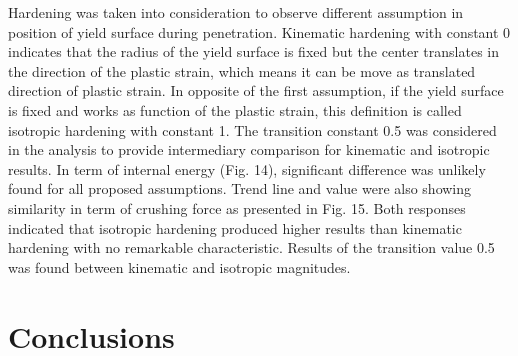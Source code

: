 \documentclass[10pt,journal]{IEEEtran}
\begin{document}
Hardening was taken into consideration to observe different assumption in position of yield surface during penetration. 
Kinematic hardening with constant 0 indicates that the radius of the yield surface is fixed but the center translates in the direction of the plastic strain, which means it can be move as translated direction of plastic strain. 
In opposite of the first assumption, if the yield surface is fixed and works as function of the plastic strain, this definition is called isotropic hardening with constant 1. 
The transition constant 0.5 was considered in the analysis to provide intermediary comparison for kinematic and isotropic results. 
In term of internal energy (Fig. 14), significant difference was unlikely found for all proposed assumptions. Trend line and value were also showing similarity in term of crushing force as presented in Fig. 15. 
Both responses indicated that isotropic hardening produced higher results than kinematic hardening with no remarkable characteristic. Results of the transition value 0.5 was found between kinematic and isotropic magnitudes. 

\section{Conclusions}
\end{document}
